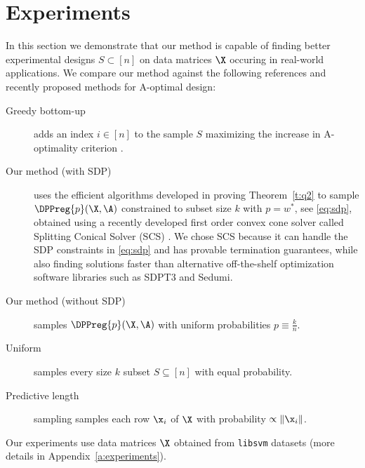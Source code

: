 \section{Experiments}\label{s:experiments}

In this section we demonstrate that our method is capable
of finding better experimental designs $S \subset [n]$
on data matrices $\X$ occuring in real-world applications.
We compare our method against the following references and recently proposed
methods for A-optimal design:
\begin{description}
    \item[Greedy bottom-up] adds an index $i \in [n]$ to the sample $S$
        maximizing the increase in A-optimality criterion
        \cite{greedy-supermodular,chamon2017approximate}.

    \item[Our method (with SDP)] uses the efficient algorithms
        developed in proving Theorem~\ref{t:q2} to sample
        $\DPPreg{p}(\X,\A)$ constrained to subset size $k$
        with $p = w^*$, see \eqref{eq:sdp},
        obtained using a         recently developed first order convex cone solver called Splitting
        Conical Solver (SCS) \cite{o2016conic}.
        We chose SCS because it can handle the SDP constraints in
        \eqref{eq:sdp} and has provable termination guarantees, while
        also finding solutions faster \cite{o2016conic} than alternative
        off-the-shelf optimization software libraries such as SDPT3 and Sedumi.

    \item[Our method (without SDP)] samples $\DPPreg{p}(\X,\A)$ with uniform
      probabilities $p \equiv \frac{k}{n}$.

    \item[Uniform] samples every size $k$ subset $S \subseteq [n]$
        with equal probability.

    \item[Predictive length] sampling \cite{zhu2015optimal} samples
        each row $\x_i$ of $\X$ with probability $\propto\|\x_i\|$.
\end{description}
Our experiments use data matrices $\X$ obtained from \texttt{libsvm} datasets
\cite{libsvm} (more details in Appendix~\ref{a:experiments}).

